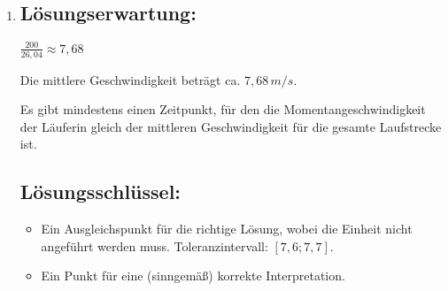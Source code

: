 \begin{langesbeispiel}
{\begin{enumerate}
	\item \subsection{Lösungserwartung:}
			
		$\frac{200}{26,04}\approx 7,68$
		
		Die mittlere Geschwindigkeit beträgt ca. $7,68\,m/s$.
		
		Es gibt mindestens einen Zeitpunkt, für den die Momentangeschwindigkeit der Läuferin gleich der mittleren Geschwindigkeit für die gesamte Laufstrecke ist.		
	\subsection{Lösungsschlüssel:}
	
\begin{itemize}
	\item   Ein Ausgleichspunkt für die richtige Lösung, wobei die Einheit nicht angeführt werden muss. Toleranzintervall: $[7,6; 7,7]$.
	\item Ein Punkt für eine (sinngemäß) korrekte Interpretation.
\end{itemize}

\end{enumerate}}
		\end{langesbeispiel}